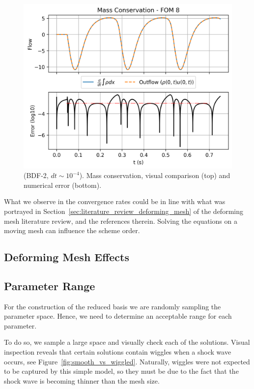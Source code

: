 \documentclass[../../thesis.tex]{subfiles}
\begin{document}
\begin{figure}[h]
    \centering
    \includegraphics[width=1\columnwidth]{research_project/piston/figures/bdf_convergence/mass_FOM_8_bdf_2.png}
    \caption{(BDF-2, $dt\sim 10^{-4}$).
    Mass conservation, visual comparison (top) and numerical error (bottom).}    \label{fig:bdf_2_mass_plot}
\end{figure}

What we observe in the convergence rates could be in line with what was portrayed 
in Section~\ref{sec:literature_review_deforming_mesh} of the deforming mesh literature review,
and the references therein.
Solving the equations on a moving mesh can influence the scheme order.

\subsection{Deforming Mesh Effects}


\subsection{Parameter Range}
For the construction of the reduced basis we are randomly sampling the parameter space.
Hence, we need to determine an acceptable range for each parameter.

To do so, we sample a large space and visually check each of the solutions.
Visual inspection reveals that certain solutions contain wiggles when a shock wave occurs, see Figure~\ref{fig:smooth_vs_wiggled}.
Naturally, wiggles were not expected to be captured by this simple model, 
so they must be due to the fact that the shock wave is becoming thinner than the mesh size.
\end{document}
